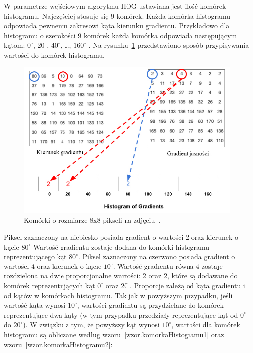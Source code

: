 \documentclass[a4paper,twoside,12pt]{book}
\begin{document}
    W parametrze wejściowym algorytmu HOG ustawiana jest ilość komórek histogramu.
    Najczęściej stosuje się 9 komórek. Każda komórka histogramu odpowiada pewnemu zakresowi kąta kierunku gradientu.
    Przykładowo dla histogramu o szerokości 9 komórek każda komórka odpowiada następującym kątom:
    $0^{\circ}$, $20^{\circ}$, $40^{\circ}$, \ldots, $160^{\circ}$ .
    Na rysunku~\ref{fig.hogTworzenieHistogramu} przedstawiono sposób przypisywania wartości do komórek histogramu.
    \begin{figure}
        \centering
        \includegraphics[width=11cm]{Obrazy/hogTworzenieHistogramu.jpg}
        \caption{Komórki o rozmiarze 8x8 pikseli na zdjęciu~\cite{hogOpenCv}.}
        \label{fig.hogTworzenieHistogramu}
    \end{figure}
    Piksel zaznaczony na niebiesko posiada gradient o wartości 2 oraz kierunek o kącie $80^{\circ}$
    Wartość gradientu zostaje dodana do komórki histogramu reprezentującego kąt $80^{\circ}$.
    Piksel zaznaczony na czerwono posiada gradient o wartości 4 oraz kierunek o kącie $10^{\circ}$.
    Wartość gradientu równa 4 zostaje rozdzielona na dwie proporcjonalne wartości: 2 oraz 2, które są dodawane do
    komórek reprezentujących kąt $0^{\circ}$ oraz $20^{\circ}$.
    Proporcje zależą od kąta gradientu i od kątów w komórkach histogramu.
    Tak jak w powyższym przypadku, jeśli wartość kąta wynosi $10^{\circ}$, wartości gradientu są przydzielane do
    komórek reprezentujące dwa kąty (w tym przypadku przedziały reprezentujące kąt od $0^{\circ}$ do
    $20^{\circ}$). W związku z tym, że powyższy kąt wynosi $10^{\circ}$, wartości dla komórek histogramu są obliczane
    według wzoru~\ref{wzor.komorkaHistogramu1} oraz wzoru~\ref{wzor.komorkaHistogramu2}:
\end{document}
